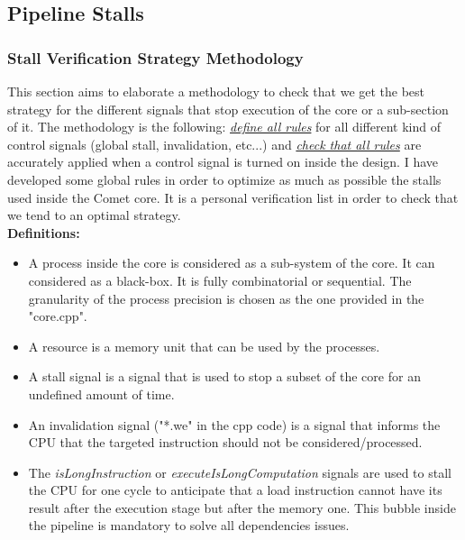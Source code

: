 \documentclass[10pt,letterpaper]{article}
\begin{document}
\newpage

\subsection{Pipeline Stalls}
 
 \subsubsection{Stall Verification Strategy Methodology}
 
 This section aims to elaborate a methodology to check that we get the best strategy for the different signals that stop execution of the core or a sub-section of it. The methodology is the following: \underline{\textit{define all rules}} for all different kind of control signals (global stall, invalidation, etc...) and \underline{\textit{check that all rules}} are accurately applied when a control signal is turned on inside the design. I have developed some global rules in order to optimize as much as possible the stalls used inside the Comet core. It is a personal verification list in order to check that we tend to an optimal strategy. \\
 
\textbf{Definitions:}
 \begin{itemize}
     \item A process inside the core is considered as a sub-system of the core. It can considered as a black-box. It is fully combinatorial or sequential. The granularity of the process precision is chosen as the one provided in the "core.cpp".
     \item A resource is a memory unit that can be used by the processes.
     \item A stall signal is a signal that is used to stop a subset of the core for an undefined amount of time.
     \item An invalidation signal ("*.we" in the cpp code) is a signal that informs the CPU that the targeted instruction should not be considered/processed.
     \item The \textit{isLongInstruction} or \textit{executeIsLongComputation} signals are used to stall the CPU for one cycle to anticipate that a load instruction cannot have its result after the execution stage but after the memory one. This bubble inside the pipeline is mandatory to solve all dependencies issues. 
 \end{itemize}
 
\end{document}
